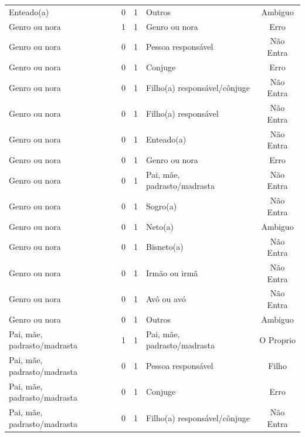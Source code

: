 \documentclass[
	12pt,				%
	openright,			%
	twoside,			%
	a4paper,			%
	english,			%
	french,				%
	spanish,			%
	brazil				%
	]{abntex2}
\begin{document}
\begin{anexosenv}
\begin{longtable}{@{}lcclc@{}}
Enteado(a)                   & 0         & 1        & Outros                       & Ambiguo         \\
Genro ou nora                & 1         & 1        & Genro ou nora                & Erro            \\
Genro ou nora                & 0         & 1        & Pessoa responsável           & Não Entra       \\
Genro ou nora                & 0         & 1        & Conjuge                      & Erro            \\
Genro ou nora                & 0         & 1        & Filho(a) responsável/cônjuge & Não Entra       \\
Genro ou nora                & 0         & 1        & Filho(a) responsável         & Não Entra       \\
Genro ou nora                & 0         & 1        & Enteado(a)                   & Não Entra       \\
Genro ou nora                & 0         & 1        & Genro ou nora                & Erro            \\
Genro ou nora                & 0         & 1        & Pai, mãe, padrasto/madrasta  & Não Entra       \\
Genro ou nora                & 0         & 1        & Sogro(a)                     & Não Entra       \\
Genro ou nora                & 0         & 1        & Neto(a)                      & Ambiguo         \\
Genro ou nora                & 0         & 1        & Bisneto(a)                   & Não Entra       \\
Genro ou nora                & 0         & 1        & Irmão ou irmã                & Não Entra       \\
Genro ou nora                & 0         & 1        & Avô ou avó                   & Não Entra       \\
Genro ou nora                & 0         & 1        & Outros                       & Ambiguo         \\
Pai, mãe, padrasto/madrasta  & 1         & 1        & Pai, mãe, padrasto/madrasta  & O Proprio       \\
Pai, mãe, padrasto/madrasta  & 0         & 1        & Pessoa responsável           & Filho           \\
Pai, mãe, padrasto/madrasta  & 0         & 1        & Conjuge                      & Erro            \\
Pai, mãe, padrasto/madrasta  & 0         & 1        & Filho(a) responsável/cônjuge & Não Entra       \\

\end{longtable}
\end{anexosenv}
\end{document}
